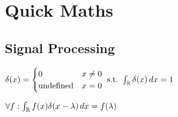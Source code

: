 \section{Quick Maths}

\subsection{Signal Processing}

\begin{definition}
  \(\delta(x) = \begin{cases}
    0 & x \neq 0 \\
    \text{undefined} & x = 0
  \end{cases} \ \text{s.t.} \ \int_{\operatorname{\mathbb{R}}} \delta(x) \,dx = 1\)
\end{definition}

\begin{theorem}
  \(\forall f: \int_{\operatorname{\mathbb{R}}} f(x)\delta(x - \lambda) \,dx = f(\lambda)\)
\end{theorem}
